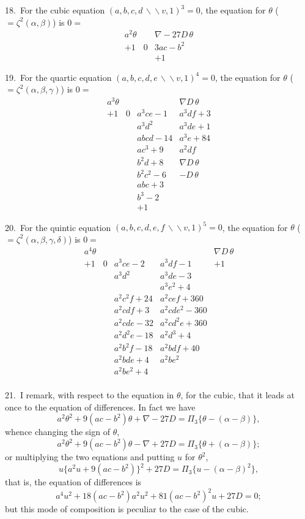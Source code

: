 \documentclass[11pt,a4paper]{article}
\theoremstyle{plain}
\theoremstyle{definition}
\theoremstyle{remark}
\begin{document}
\newpage
\setcounter{page}{306}

18.\ For the cubic equation $(a,b,c,d\,\backslash\!\!\backslash v, 1)^3=0$, the equation for $\theta$ ($=\zeta^2(\alpha,\beta)$) is $0=$
\[
\begin{array}{ccc}
a^2\theta & & \nabla-27D\,\theta\\
+1 & 0 & 3ac-b^2\\
& & +1
\end{array}
\]

19.\ For the quartic equation $(a,b,c,d,e\,\backslash\!\!\backslash v, 1)^4=0$, the equation for $\theta$ ($=\zeta^2(\alpha,\beta,\gamma)$) is $0=$
\[
\begin{array}{cccc}
a^3\theta & & & \nabla D\,\theta\\
+1 & 0 & a^3ce-1 & a^3df+3\\
& & a^3d^2 & a^3de+1\\
& & abcd-14 & a^3e+84\\
& & ac^3+9 & a^2df\\
& & b^2d+8 & \nabla D\,\theta\\
& & b^2c^2-6 & -D\,\theta\\
& & abc+3 & \\
& & b^3-2 & \\
& & +1 &
\end{array}
\]

20.\ For the quintic equation $(a,b,c,d,e,f\,\backslash\!\!\backslash v, 1)^5=0$, the equation for $\theta$ ($=\zeta^2(\alpha,\beta,\gamma,\delta)$) is $0=$
\[
\begin{array}{ccccc}
a^4\theta & & & & \nabla D\,\theta\\
+1 & 0 & a^3ce-2 & a^3df-1 & +1\\
& & a^3d^2 & a^3de-3 & \\
& & & a^3e^2+4 & \\
& & a^2c^2f+24 & a^2cef+360 & \\
& & a^2cdf+3 & a^2cde^2-360 & \\
& & a^2cde-32 & a^2cd^2e+360 & \\
& & a^2d^2e-18 & a^2d^3+4 & \\
& & a^2b^2f-18 & a^2bdf+40 & \\
& & a^2bde+4 & a^2be^2 & \\
& & a^2be^2+4 & & \\
\end{array}
\]

\newpage
\setcounter{page}{307}

21.\ I remark, with respect to the equation in $\theta$, for the cubic, that it leads at once to the equation of differences. In fact we have
\[
a^2\theta^2 + 9(ac-b^2)\theta + \nabla-27D = \Pi_3\{\theta-(\alpha-\beta)\},
\]
whence changing the sign of $\theta$,
\[
a^2\theta^2 + 9(ac-b^2)\theta - \nabla+27D = \Pi_3\{\theta+(\alpha-\beta)\};
\]
or multiplying the two equations and putting $u$ for $\theta^2$,
\[
u\{a^2u+9(ac-b^2)\}^2 + 27D = \Pi_3\{u-(\alpha-\beta)^2\},
\]
that is, the equation of differences is
\[
a^4u^2 + 18(ac-b^2)a^2u^2 + 81(ac-b^2)^2u + 27D = 0;
\]
but this mode of composition is peculiar to the case of the cubic.
\end{document}
